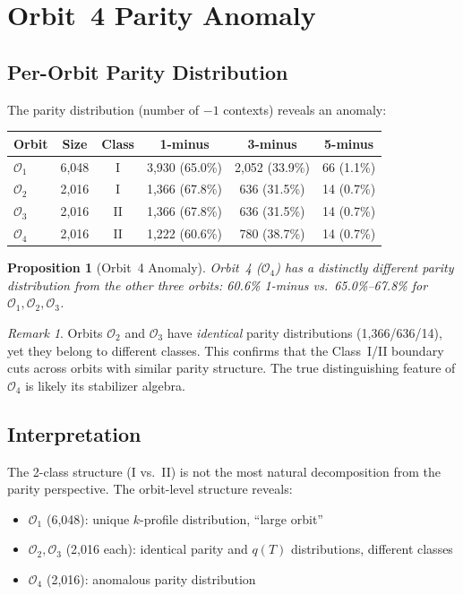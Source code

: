 \documentclass[11pt,a4paper]{article}
\newtheorem{proposition}[theorem]{Proposition}
\theoremstyle{remark}
\newtheorem{remark}[theorem]{Remark}
\begin{document}
\section{Orbit~4 Parity Anomaly}\label{sec:orbit4}

\subsection{Per-Orbit Parity Distribution}

The parity distribution (number of $-1$ contexts) reveals an anomaly:

\begin{center}
\begin{tabular}{lccccc}
\toprule
Orbit & Size & Class & 1-minus & 3-minus & 5-minus \\
\midrule
$\mathcal{O}_1$ & 6{,}048 & I & 3{,}930 (65.0\%) & 2{,}052 (33.9\%) & 66 (1.1\%) \\
$\mathcal{O}_2$ & 2{,}016 & I & 1{,}366 (67.8\%) & 636 (31.5\%) & 14 (0.7\%) \\
$\mathcal{O}_3$ & 2{,}016 & II & 1{,}366 (67.8\%) & 636 (31.5\%) & 14 (0.7\%) \\
$\mathcal{O}_4$ & 2{,}016 & II & 1{,}222 (60.6\%) & 780 (38.7\%) & 14 (0.7\%) \\
\bottomrule
\end{tabular}
\end{center}

\begin{proposition}[Orbit~4 Anomaly]\label{prop:orbit4}
Orbit~4 ($\mathcal{O}_4$) has a distinctly different parity distribution from the other three orbits:
60.6\% 1-minus vs.\ 65.0\%--67.8\% for $\mathcal{O}_1, \mathcal{O}_2, \mathcal{O}_3$.
\end{proposition}

\begin{remark}
Orbits $\mathcal{O}_2$ and $\mathcal{O}_3$ have \emph{identical} parity distributions (1{,}366/636/14), yet they belong to different classes.
This confirms that the Class~I/II boundary cuts across orbits with similar parity structure.
The true distinguishing feature of $\mathcal{O}_4$ is likely its stabilizer algebra.
\end{remark}

\subsection{Interpretation}

The 2-class structure (I vs.\ II) is not the most natural decomposition from the parity perspective.
The orbit-level structure reveals:
\begin{itemize}
  \item $\mathcal{O}_1$ (6{,}048): unique $k$-profile distribution, ``large orbit''
  \item $\mathcal{O}_2, \mathcal{O}_3$ (2{,}016 each): identical parity and $q(T)$ distributions, different classes
  \item $\mathcal{O}_4$ (2{,}016): anomalous parity distribution
\end{itemize}
\end{document}
